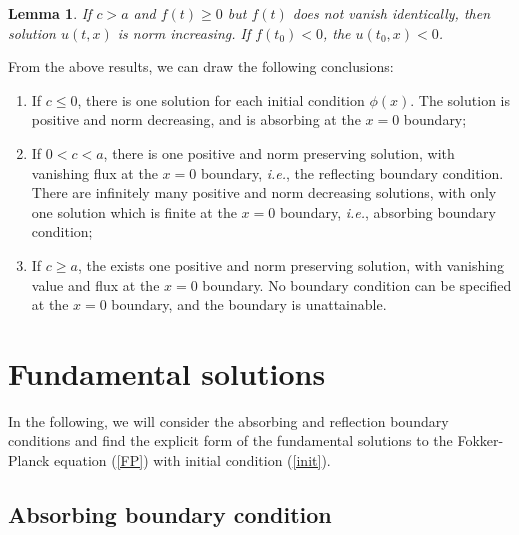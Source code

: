 \documentclass[12pt]{article}
\newtheorem{lemma}[theorem]{Lemma}
\begin{document}
  \begin{lemma}
    If $c>a$ and $f(t)\ge 0$ but $f(t)$ does not vanish identically, then solution $u(t,x)$ is norm increasing. If $f(t_0)<0$, the
    $u(t_0,x)<0$.
  \end{lemma}

  From the above results, we can draw the following conclusions:
  \begin{enumerate}[noitemsep]
    \item If $c\le 0$, there is one solution for each initial condition $\phi(x)$. The solution is positive and norm decreasing, and is
          absorbing at the $x=0$ boundary;

    \item If $0<c<a$, there is one positive and norm preserving solution, with vanishing flux at the $x=0$ boundary, {\it i.e.}, the reflecting
          boundary condition. There are infinitely many positive and norm decreasing solutions, with only one solution which is finite
          at the $x=0$ boundary, {\it i.e.}, absorbing boundary condition;

    \item If $c\ge a$, the exists one positive and norm preserving solution, with vanishing value and flux at the $x=0$ boundary.
          No boundary condition can be specified at the $x=0$ boundary, and the boundary is unattainable.
  \end{enumerate}

\section{Fundamental solutions}

  In the following, we will consider the absorbing and reflection boundary conditions and find the explicit form of the
  fundamental solutions to the Fokker-Planck equation (\ref{FP}) with initial condition (\ref{init}).

  \subsection{Absorbing boundary condition}
\end{document}
